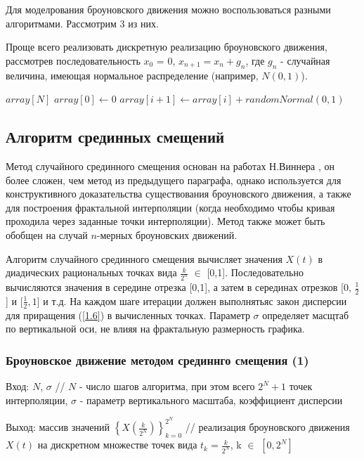 Для моделрования броуновского движения можно воспользоваться разными алгоритмами. Рассмотрим 3 из них.

Проще всего реализовать дискретную реализацию броуновского движения, рассмотрев последовательность $x_0$ = 0, $x_{n+1} = x_n + g_n$, где $g_n$ - случайная величина, имеющая нормальное распределение (например, $N(0,1)$).

\begin{algorithmic}[1]
	\State $array[N]$
	\State $array[0]\gets 0$
	\State $array[i+1]\gets array[i] + randomNormal(0,1)$
	\EndFor
\end{algorithmic}

\subsection{Алгоритм срединных смещений}

Метод случайного срединного смещения основан на работах Н.Виннера , он более сложен, чем метод из предыдущего параграфа, однако используется для конструктивного доказательства существования броуновского движения, а также для построения фрактальной интерполяции (когда необходимо чтобы кривая проходила через заданные точки интерполяции). Метод также может быть обобщен на случай $n$-мерных броуновских движений.

Алгоритм случайного срединного смещения вычисляет значения $X(t)$ в диадических рациональных точках вида $\frac{k}{2^n}$ $\in$ [0,1]. Последовательно вычисляются значения в середине отрезка [0,1], а затем в серединах отрезков [0, $\frac{1}{2}$] и [$\frac{1}{2}, 1$] и т.д. На каждом шаге итерации должен выполнятьяс закон дисперсии для приращения (\ref{1.6}) в вычисленных точках. Параметр $\sigma$ определяет масщтаб по вертикальной оси, не влияя на фрактальную размерность графика. 

\subsubsection{Броуновское движение методом срединнго смещения (1)}
Вход: $N$, 	$\sigma$ // $N$ - число шагов алгоритма, при этом всего $2^N + 1$ точек интерполяции, $\sigma$ - параметр вертикального масштаба, коэффициент дисперсии
 
Выход: массив значений $\left\{X(\frac{k}{2^N})\right\}_{k=0}^{2^N}$ // реализация броуновского движения $X(t)$ на дискретном множестве точек вида $t_k = \frac{k}{2^N}$, k $\in$ $[0, 2^N]$

